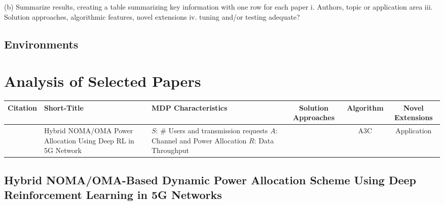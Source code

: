 \documentclass[journal]{IEEEtran}
\begin{document}
(b) Summarize results, creating a table summarizing key information with one row for each paper 
i. Authors, topic or application area
iii. Solution approaches, algorithmic features, novel extensions
iv. tuning and/or testing adequate?


\subsection{Environments}



\section{Analysis of Selected Papers}
\label{sec:selected_papers}

\begin{table*}
    \begin{tabularx}{\textwidth}{cX X ccc}
        Citation & Short-Title & MDP Characteristics & Solution Approaches & Algorithm &
        Novel Extensions\\
        \midrule
        \cite{giang2020} & Hybrid NOMA/OMA Power Allocation Using Deep RL in 5G Network & 
        $S$: \# Users and transmission requests \newline
        $A$: Channel and Power Allocation \newline
        $R$: Data Throughput &
        & A3C\cite{mnih2016} & Application
    \end{tabularx}
\end{table*}

%
%
\begin{table*}
\end{table*}


\subsection{Hybrid NOMA/OMA-Based Dynamic Power Allocation Scheme 
Using Deep Reinforcement Learning in 5G Networks}
\end{document}
